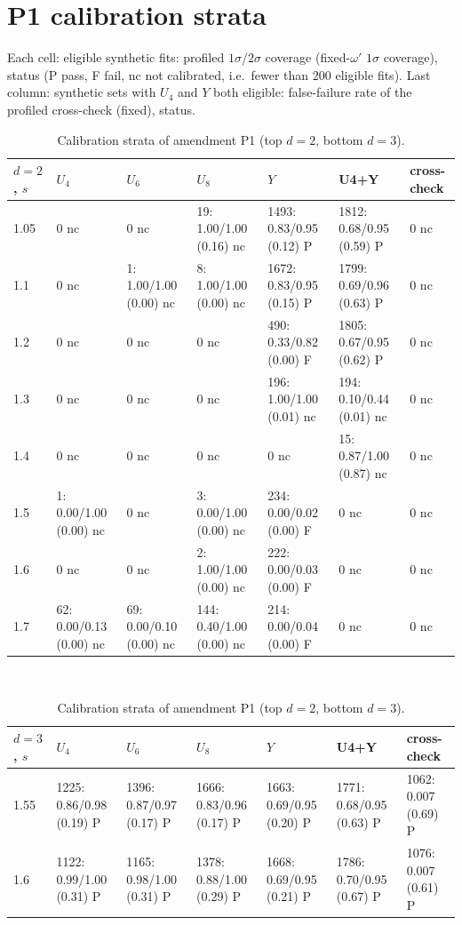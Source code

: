 \documentclass[10pt,a4paper]{article}
\begin{document}
\section{P1 calibration strata}\label{app:calib}
Each cell: eligible synthetic fits: profiled $1\sigma$/$2\sigma$ coverage (fixed-$\omega'$ $1\sigma$ coverage), status (P pass, F fail, nc not
calibrated, i.e.\ fewer than 200 eligible fits). Last column: synthetic sets with $U_4$ and $Y$ both eligible: false-failure rate of the profiled
cross-check (fixed), status.
\begin{table}\centering\footnotesize\setlength{\tabcolsep}{4pt}
\caption{Calibration strata of amendment P1 (top $d=2$, bottom $d=3$).}\label{tab:calib}
\begin{tabular}{@{}lllllll@{}}\toprule
$d=2$, $s$ & $U_4$ & $U_6$ & $U_8$ & $Y$ & U4+Y & cross-check \\\midrule
1.05 & 0 nc & 0 nc & 19: 1.00/1.00 (0.16) nc & 1493: 0.83/0.95 (0.12) P & 1812: 0.68/0.95 (0.59) P & 0 nc \\
1.1 & 0 nc & 1: 1.00/1.00 (0.00) nc & 8: 1.00/1.00 (0.00) nc & 1672: 0.83/0.95 (0.15) P & 1799: 0.69/0.96 (0.63) P & 0 nc \\
1.2 & 0 nc & 0 nc & 0 nc & 490: 0.33/0.82 (0.00) F & 1805: 0.67/0.95 (0.62) P & 0 nc \\
1.3 & 0 nc & 0 nc & 0 nc & 196: 1.00/1.00 (0.01) nc & 194: 0.10/0.44 (0.01) nc & 0 nc \\
1.4 & 0 nc & 0 nc & 0 nc & 0 nc & 15: 0.87/1.00 (0.87) nc & 0 nc \\
1.5 & 1: 0.00/1.00 (0.00) nc & 0 nc & 3: 0.00/1.00 (0.00) nc & 234: 0.00/0.02 (0.00) F & 0 nc & 0 nc \\
1.6 & 0 nc & 0 nc & 2: 1.00/1.00 (0.00) nc & 222: 0.00/0.03 (0.00) F & 0 nc & 0 nc \\
1.7 & 62: 0.00/0.13 (0.00) nc & 69: 0.00/0.10 (0.00) nc & 144: 0.40/1.00 (0.00) nc & 214: 0.00/0.04 (0.00) F & 0 nc & 0 nc \\
\bottomrule\end{tabular}\\[12pt]
\begin{tabular}{@{}lllllll@{}}\toprule
$d=3$, $s$ & $U_4$ & $U_6$ & $U_8$ & $Y$ & U4+Y & cross-check \\\midrule
1.55 & 1225: 0.86/0.98 (0.19) P & 1396: 0.87/0.97 (0.17) P & 1666: 0.83/0.96 (0.17) P & 1663: 0.69/0.95 (0.20) P & 1771: 0.68/0.95 (0.63) P & 1062: 0.007 (0.69) P \\
1.6 & 1122: 0.99/1.00 (0.31) P & 1165: 0.98/1.00 (0.31) P & 1378: 0.88/1.00 (0.29) P & 1668: 0.69/0.95 (0.21) P & 1786: 0.70/0.95 (0.67) P & 1076: 0.007 (0.61) P \\

\end{tabular}
\end{table}
\end{document}
